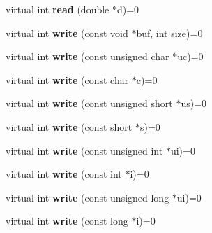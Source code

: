 \begin{DoxyCompactItemize}
\item 
virtual int {\bfseries read} (double $\ast$d)=0\hypertarget{class_i_dream_sky_1_1_i_o_a2364748b5d19837893956f0935e7a425}{}\label{class_i_dream_sky_1_1_i_o_a2364748b5d19837893956f0935e7a425}

\item 
virtual int {\bfseries write} (const void $\ast$buf, int size)=0\hypertarget{class_i_dream_sky_1_1_i_o_ad5617d23d6f13e412d36672904a8c15c}{}\label{class_i_dream_sky_1_1_i_o_ad5617d23d6f13e412d36672904a8c15c}

\item 
virtual int {\bfseries write} (const unsigned char $\ast$uc)=0\hypertarget{class_i_dream_sky_1_1_i_o_a7e8c224996c1745e46bf01af2a7bf28e}{}\label{class_i_dream_sky_1_1_i_o_a7e8c224996c1745e46bf01af2a7bf28e}

\item 
virtual int {\bfseries write} (const char $\ast$c)=0\hypertarget{class_i_dream_sky_1_1_i_o_a7d1b8d2afd4b653280087ae6b588e7b7}{}\label{class_i_dream_sky_1_1_i_o_a7d1b8d2afd4b653280087ae6b588e7b7}

\item 
virtual int {\bfseries write} (const unsigned short $\ast$us)=0\hypertarget{class_i_dream_sky_1_1_i_o_a7c77b0feebcee231a3aa5a59a8c0e685}{}\label{class_i_dream_sky_1_1_i_o_a7c77b0feebcee231a3aa5a59a8c0e685}

\item 
virtual int {\bfseries write} (const short $\ast$s)=0\hypertarget{class_i_dream_sky_1_1_i_o_aa2005361c44a3a05935c61de10cf9a8b}{}\label{class_i_dream_sky_1_1_i_o_aa2005361c44a3a05935c61de10cf9a8b}

\item 
virtual int {\bfseries write} (const unsigned int $\ast$ui)=0\hypertarget{class_i_dream_sky_1_1_i_o_a61525597d0054253dfa7b57e54338a2a}{}\label{class_i_dream_sky_1_1_i_o_a61525597d0054253dfa7b57e54338a2a}

\item 
virtual int {\bfseries write} (const int $\ast$i)=0\hypertarget{class_i_dream_sky_1_1_i_o_a65a8cd02fba0c6d4d8dc4e123d453f7a}{}\label{class_i_dream_sky_1_1_i_o_a65a8cd02fba0c6d4d8dc4e123d453f7a}

\item 
virtual int {\bfseries write} (const unsigned long $\ast$ui)=0\hypertarget{class_i_dream_sky_1_1_i_o_ab18cff4980f527837c8926fd92dcd6a8}{}\label{class_i_dream_sky_1_1_i_o_ab18cff4980f527837c8926fd92dcd6a8}

\item 
virtual int {\bfseries write} (const long $\ast$i)=0\hypertarget{class_i_dream_sky_1_1_i_o_ae9a25cd6fc7d4899a2d822fc2ec915f6}{}\label{class_i_dream_sky_1_1_i_o_ae9a25cd6fc7d4899a2d822fc2ec915f6}


\end{DoxyCompactItemize}
